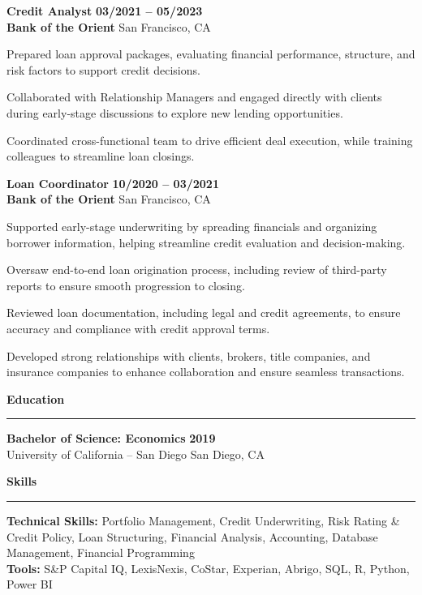 \documentclass[letterpaper,11pt]{article}
\renewcommand{\section}[1]{%
  \vspace{5pt}%
  {\large\bfseries\color{sectionblue}#1}\\[-6pt]%
  {\color{sectionblue}\rule{\textwidth}{0.8pt}}%
  \vspace{1pt}%
}
\renewenvironment{itemize}{%
  \begin{list}{\textbullet}{%
    \setlength{\leftmargin}{1.5em}%
    \setlength{\itemsep}{1pt}%
    \setlength{\parsep}{0pt}%
    \setlength{\topsep}{1pt}%
    \setlength{\partopsep}{0pt}%
  }%
}{\end{list}}
\begin{document}
\vspace{1pt}

\textbf{Credit Analyst} \hfill \textbf{03/2021 -- 05/2023}\\
\textbf{Bank of the Orient} \hfill San Francisco, CA
\begin{itemize}
  \item Prepared loan approval packages, evaluating financial performance, structure, and risk factors to support credit decisions.
  \item Collaborated with Relationship Managers and engaged directly with clients during early-stage discussions to explore new lending opportunities.
  \item Coordinated cross-functional team to drive efficient deal execution, while training colleagues to streamline loan closings.
\end{itemize}

\vspace{1pt}

\textbf{Loan Coordinator} \hfill \textbf{10/2020 -- 03/2021}\\
\textbf{Bank of the Orient} \hfill San Francisco, CA
\begin{itemize}
  \item Supported early-stage underwriting by spreading financials and organizing borrower information, helping streamline credit evaluation and decision-making.
  \item Oversaw end-to-end loan origination process, including review of third-party reports to ensure smooth progression to closing.
  \item Reviewed loan documentation, including legal and credit agreements, to ensure accuracy and compliance with credit approval terms.
  \item Developed strong relationships with clients, brokers, title companies, and insurance companies to enhance collaboration and ensure seamless transactions.
\end{itemize}

\section{Education}

\textbf{Bachelor of Science: Economics} \hfill \textbf{2019}\\
University of California -- San Diego \hfill San Diego, CA

\section{Skills}

\textbf{Technical Skills:} Portfolio Management, Credit Underwriting, Risk Rating \& Credit Policy, Loan Structuring, Financial Analysis, Accounting, Database Management, Financial Programming\\[2pt]
\textbf{Tools:} S\&P Capital IQ, LexisNexis, CoStar, Experian, Abrigo, SQL, R, Python, Power BI
\end{document}
